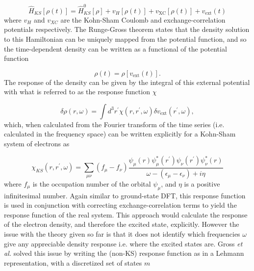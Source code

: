 \begin{equation}
\hat{H}_{KS}\left[\rho\left(t\right)\right] = \hat{H}^0_{KS}\left[\rho\right] + v_H\left[\rho\left(t\right)\right] + v_{\text{XC}}\left[\rho\left(t\right)\right] + v_{\text{ext}}\left(t\right)
\end{equation} 
%
where $v_H$ and $v_{XC}$ are the Kohn-Sham Coulomb and exchange-correlation potentials 
respectively. The Runge-Gross theorem states that the density solution to this Hamiltonian
can be uniquely mapped from the potential function, and so the time-dependent density 
can be written as a functional of the potential function

\begin{equation}
\rho\left(t\right) = \rho\left[v_{\text{ext}}\left(t\right)\right].
\end{equation}
%
The response of the density can be given by the integral of this external potential
with what is referred to as the response function $\chi$

\begin{equation}
    \delta \rho \left(r, \omega \right) = \int d^3 r^\prime \chi \left(r, r^\prime, \omega \right) \delta v_{\text{ext}} \left(r^\prime, \omega \right),
\end{equation}
%
which, when calculated from the Fourier transform of the time series (i.e. calculated 
in the frequency space) can be written explicitly for a Kohn-Sham system of electrons 
as

\begin{equation}
    \chi_{KS} \left(r, r^\prime, \omega \right) = \sum_{\mu\nu} \left(f_\mu - f_\nu \right) \frac{\psi_\mu\left(r\right)\psi^\ast_\mu\left(r^\prime\right) \psi_\nu\left(r^\prime\right) \psi^\ast_\nu\left(r\right)}{\omega - \left(\epsilon_\mu - \epsilon_\nu\right) + i\eta}
\end{equation}
%
where $f_\mu$ is the occupation number of the orbital $\psi_\mu$, and $\eta$ is a positive
infinitesimal number. Again similar to ground-state DFT, this response function 
is used in conjunction with correcting exchange-correlation terms to yield the response
function of the real system. This approach would calculate the response of the electron
density, and therefore the  excited state, explicitly. However the issue with the
theory given so far is that it does not identify which frequencies $\omega$ give
any appreciable density response i.e. where the excited states are. Gross \emph{et al.}
solved this issue by writing the (non-KS) response function as in a Lehmann representation,
with a discretized set of states $m$

